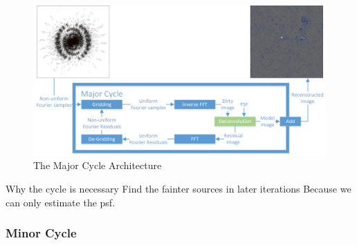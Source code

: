 \begin{figure}[h]
	\centering
	\includegraphics[width=0.80\linewidth]{./chapters/02.hypo/Major-Minor3.png}
	\caption{The Major Cycle Architecture}
	\label{intro:major}
\end{figure}

Why the cycle is necessary
Find the fainter sources in later iterations
Because we can only estimate the psf.


\subsubsection{Minor Cycle}


